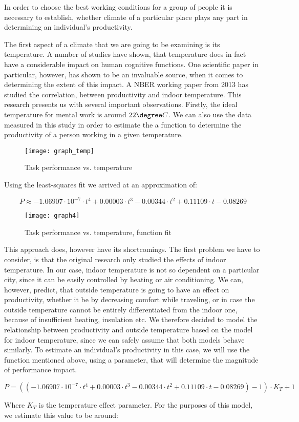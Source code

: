 
In order to choose the best working conditions for a group of people it is necessary to establish, whether climate of a particular place plays any part in determining an individual's productivity.

The first aspect of a climate that we are going to be examining is its temperature. A number of studies   have shown, that temperature does in fact have a considerable impact on human cognitive functions. One scientific paper in particular, however, has shown to be an invaluable source, when it comes to determining the extent of this impact. A NBER working paper from 2013  has studied the correlation, between productivity and indoor temperature. This research presents us with several important observations. Firstly, the ideal temperature for mental work is around $22\degree C$. We can also use the data measured in this study in order to estimate the a function to determine the productivity of a person working in a given temperature.

\begin{figure}[ht]
	\centering
    	\texttt{[image: graph\_temp]}
    \caption{Task performance vs. temperature }
\end{figure}

Using the least-squares fit we arrived at an approximation of:

$$P\approx -1.06907 \cdot 10^{-7} \cdot t^{4}+0.00003 \cdot t^{3}-0.00344 \cdot t^{2}+0.11109 \cdot t-0.08269$$

\begin{figure}[ht]
	\centering
    	\texttt{[image: graph4]}
    \caption{Task performance vs. temperature, function fit}
\end{figure}

This approach does, however have its shortcomings. The first problem we have to consider, is that the original research only studied the effects of indoor temperature. In our case, indoor temperature is not so dependent on a particular city, since it can be easily controlled by heating or air conditioning. We can, however, predict, that outside temperature is going to have an effect on productivity, whether it be by decreasing comfort while traveling, or in case the outside temperature cannot be entirely differentiated from the indoor one, because of insufficient heating, insulation etc. We therefore decided to model the relationship between productivity and outside temperature based on the model for indoor temperature, since we can safely assume that both models behave similarly. To estimate an individual's productivity in this case, we will use the function mentioned above, using a parameter, that will determine the magnitude of performance impact.

$$P=\left( (-1.06907 \cdot 10^{-7} \cdot t^{4}+0.00003 \cdot t^{3}-0.00344 \cdot t^{2}+0.11109 \cdot t-0.08269)-1 \right)\cdot K_{T}+1$$

Where $K_{T}$ is the temperature effect parameter. For the purposes of this model, we estimate this value to be around:


